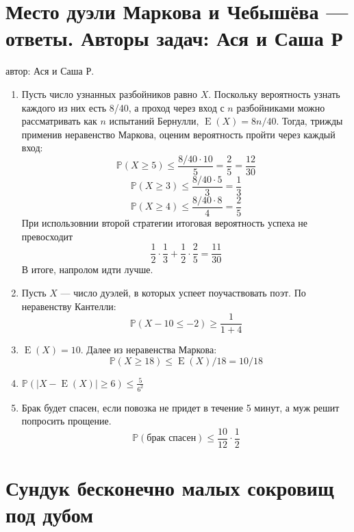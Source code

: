 \documentclass[a4paper,12pt]{article}
\DeclareMathOperator{\E}{E}
\def \P{\mathbb{P}}
\begin{document}
\section{Место дуэли Маркова и Чебышёва — ответы. Авторы задач: Ася и Саша Р}
автор: Ася и Саша Р.

\begin{enumerate}
\item Пусть число узнанных разбойников равно $X$. Поскольку вероятность узнать каждого из них есть 8/40, 
а проход через вход с $n$ разбойниками можно рассматривать как $n$ испытаний Бернулли, $\E(X)=8n/40$. 
Тогда, трижды применив неравенство Маркова, оценим вероятность пройти через каждый вход:
\[\P(X\geq5)\leq \frac{8/40\cdot10}{5}=\frac{2}{5}=\frac{12}{30}\]
\[\P(X\geq3)\leq \frac{8/40\cdot5}{3}=\frac{1}{3}\]
\[\P(X\geq4)\leq \frac{8/40\cdot8}{4}=\frac{2}{5}\]
При использовнии второй стратегии итоговая вероятность успеха не превосходит
\[\frac{1}{2}\cdot\frac{1}{3}+\frac{1}{2}\cdot\frac{2}{5}=\frac{11}{30}\]
В итоге, напролом идти лучше.
\item Пусть $X$ — число дуэлей, в которых успеет поучаствовать поэт.
По неравенству Кантелли:
\[
\P(X-10\leq -2) \geq \frac{1}{1+4}
\]
\item $\E(X) = 10$. Далее из неравенства Маркова:
\[
\P(X\geq18)\leq \E(X)/18=10/18
\]
\item
$\P(|X - \E(X)|\geq 6)\leq \frac{5}{6^2}$
\item Брак будет спасен, если повозка не придет в течение 5 минут, а муж решит попросить прощение.
\[
\P(\text{брак спасен})\leq \frac{10}{12}\cdot \frac{1}{2}
\]

\end{enumerate}


\newpage
\section{Сундук бесконечно малых сокровищ под дубом} %
\end{document}
